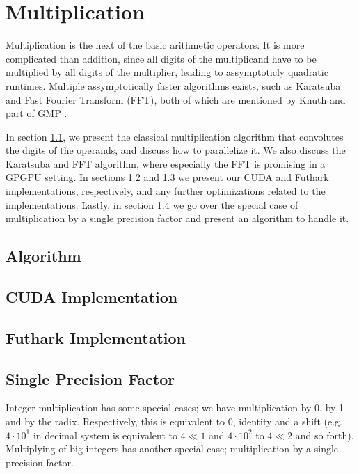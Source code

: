 \section{Multiplication}
\label{sec:mul}

Multiplication is the next of the basic arithmetic operators. It is more
complicated than addition, since all digits of the multiplicand have to be
multiplied by all digits of the multiplier, leading to assymptoticly quadratic
runtimes. Multiple assymptotically faster algorithms exists, such as Karatsuba
and Fast Fourier Transform (FFT), both of which are mentioned by Knuth and part
of GMP \cite{knuth97} \cite{GMP}.

In section \ref{subsec:mulalg}, we present the classical multiplication
algorithm that convolutes the digits of the operands, and discuss how to
parallelize it. We also discuss the Karatsuba and FFT algorithm, where
especially the FFT is promising in a GPGPU setting. In sections
\ref{subsec:mulcud} and \ref{subsec:mulfut} we present our CUDA and Futhark
implementations, respectively, and any further optimizations related to the
implementations. Lastly, in section \ref{subsec:mulsin} we go over the special
case of multiplication by a single precision factor and present an algorithm to
handle it.

\subsection{Algorithm}
\label{subsec:mulalg}


\subsection{CUDA Implementation}
\label{subsec:mulcud}


\subsection{Futhark Implementation}
\label{subsec:mulfut}


\subsection{Single Precision Factor}
\label{subsec:mulsin}

Integer multiplication has some special cases; we have multiplication by 0, by 1
and by the radix. Respectively, this is equivalent to 0, identity and a shift
(e.g. $4 \cdot 10^1$ in decimal system is equivalent to $4 \ll 1$ and
$4\cdot 10^2$ to $4\ll 2$ and so forth). Multiplying of big integers has another
special case; multiplication by a single precision factor.

